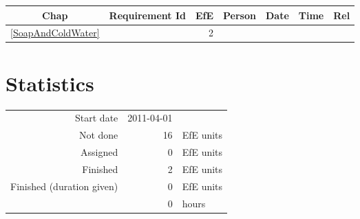 {\small \begin{longtable}{|c|p{5.5cm}||r|l|l|r|r|} \hline
\textbf{Chap} & \textbf{Requirement Id} & \textbf{EfE} & \textbf{Person} & \textbf{Date} & \textbf{Time} & \textbf{Rel} \\ \hline\endhead
\ref{SoapAndColdWater} & \nameref{SoapAndColdWater} & 2 & \  &  & \  & \  \\ \hline
\end{longtable}}\section{Statistics}
\begin{longtable}{rrl}
Start date & 2011-04-01 & \\ 
Not done & 16 & EfE units \\ 
Assigned & 0 & EfE units \\ 
Finished & 2 & EfE units \\ 
Finished (duration given) & 0 & EfE units \\ 
 & 0 & hours \\ 
\end{longtable}